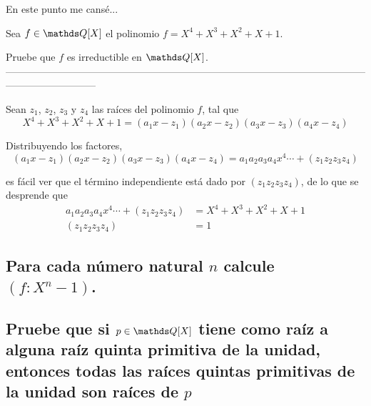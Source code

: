 \documentclass[a4paper,spanish]{article}
\begin{document}
  \vspace{3em}

  En este punto me cansé...

  \newpage
  Sea $f \in \Q[X]$ el polinomio $f = X^4 + X^3 + X^2 + X + 1$.

  Pruebe que $f$ es irreductible en $\Q[X]$.
  \newline
  ---------------------------------------------------------------------------------------------------------------------------------------
  \newline

  Sean $z_1$, $z_2$, $z_3$ y $z_4$ las raíces del polinomio $f$, tal que
  \[
    X^4 + X^3 + X^2 + X + 1 = (a_1x-z_1)(a_2x-z_2)(a_3x-z_3)(a_4x-z_4)
  \]

  Distribuyendo los factores,
  \[
    (a_1x-z_1)(a_2x-z_2)(a_3x-z_3)(a_4x-z_4) = a_1a_2a_3a_4x^4 \cdots + (z_1z_2z_3z_4)
  \]

  es fácil ver que el término independiente está dado por $(z_1z_2z_3z_4)$,
  de lo que se desprende que
  \begin{align*}
    a_1a_2a_3a_4x^4 \cdots + (z_1z_2z_3z_4) &= X^4 + X^3 + X^2 + X + 1 \\
    (z_1z_2z_3z_4) &= 1
  \end{align*}

  \subsection{%
    Para cada número natural $n$ calcule $(f:X^n-1)$.%
  }
  
  \subsection{%
    Pruebe que si $p \in \Q[X]$ tiene como raíz a alguna raíz quinta %
    primitiva de la unidad, entonces todas las raíces quintas primitivas %
    de la unidad son raíces de $p$%
  }
\end{document}
